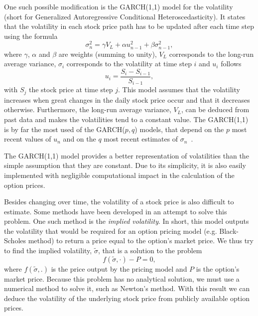 \documentclass[a4paper,twocolumn,aps,prd,longbibliography,superscriptaddress]{revtex4-1}
\begin{document}
One such possible modification is the GARCH(1,1) model for the volatility~\cite{Wei} (short for Generalized Autoregressive Conditional Heteroscedasticity).
It states that the volatility in each stock price path has to be updated after each time step using the formula
\begin{equation}
\sigma_n^2=\gamma V_L+\alpha u_{n-1}^2+\beta\sigma_{n-1}^2,
\end{equation}
\noindent where $\gamma$, $\alpha$ and $\beta$ are weights (summing to unity), $V_L$ corresponds to the long-run average variance, $\sigma_i$ corresponds to the volatility at time step $i$ and $u_i$ follows
\begin{equation}
u_i=\frac{S_i-S_{i-1}}{S_{i-1}},
\end{equation}
\noindent with $S_j$ the stock price at time step $j$.
This model assumes that the volatility increases when great changes in the daily stock price occur and that it decreases otherwise. Furthermore, the long-run average variance, $V_L$, can be deduced from past data and makes the volatilities tend to a constant value.
The GARCH(1,1) is by far the most used of the GARCH($p,q$) models, that depend on the $p$ most recent values of $u_n$ and on the $q$ most recent estimates of $\sigma_n$~\citep{Hull}.

The GARCH(1,1) model provides a better representation of volatilities than the simple assumption that they are constant. Due to its simplicity, it is also easily implemented with negligible computational impact in the calculation of the option prices.

Besides changing over time, the volatility of a stock price is also difficult to estimate. Some methods have been developed in an attempt to solve this problem. One such method is the \textit{implied volatility}. In short, this model outputs the volatility that would be required for an option pricing model (e.g. Black-Scholes method) to return a price equal to the option's market price.
We thus try to find the implied volatility, $\widetilde{\sigma}$, that is a solution to the problem
\begin{equation}
f(\widetilde{\sigma},\cdot)-P=0,
\end{equation}
\noindent where $f(\widetilde{\sigma},.)$ is the price output by the pricing model and $P$ is the option's market price.
Because this problem has no analytical solution, we must use a numerical method to solve it, such as Newton's method.
With this result we can deduce the volatility of the underlying stock price from publicly available option prices.
\end{document}
